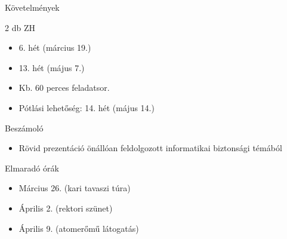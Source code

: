 \documentclass[12 pt]{beamer}
\newcommand{\tanedo}{tanedolight}		%
\newcommand{\Comment}[1]{\textcolor{Comment}{\footnotesize{#1}\normalsize}} %
\begin{document}
{\begin{frame}[c]
\begin{center}
\end{center}
\end{frame}
}



\begin{frame}{Követelmények}

  \begin{block}{2 db ZH}
    \begin{itemize}
        \item{6. hét (március 19.)}
        \item{13. hét (május 7.)}
        \item{Kb. 60 perces feladatsor.}
        \item{Pótlási lehetőség: 14. hét (május 14.)}
    \end{itemize}
  \end{block}

  \begin{block}{Beszámoló}
    \begin{itemize}
      \item{Rövid prezentáció önállóan feldolgozott informatikai biztonsági témából}
    \end{itemize}
  \end{block}

  \begin{block}{Elmaradó órák}
    \begin{itemize}
      \item{Március 26. (kari tavaszi túra)}
      \item{Április 2. (rektori szünet)}
      \item{Április 9. (atomerőmű látogatás)}
    \end{itemize}
  \end{block}

\end{frame}
\end{document}
